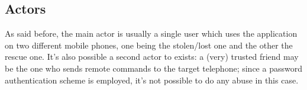 \subsection{Actors} 
\small{As said before, the main actor is usually a single user which uses the application on two different mobile phones, one being the stolen/lost one and the other the rescue one. It's also possible a second actor to exists: a (very) trusted friend may be the one who sends remote commands to the target telephone; since a password authentication scheme is employed, it's not possible to do any abuse in this case.}